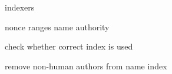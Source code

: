indexers

nonce
ranges
name authority

check whether correct index is used

remove non-human authors from name index

